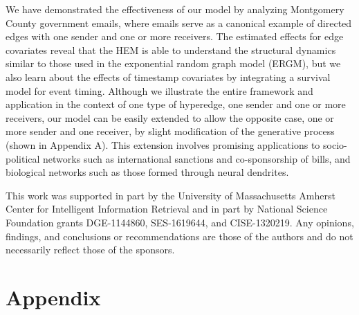 \documentclass[ba]{imsart}
\numberwithin{equation}{section}
\theoremstyle{plain}
\begin{document}
	We have demonstrated the effectiveness of our model by analyzing Montgomery County government emails, where emails serve as a canonical example of directed edges with one sender and one or more receivers. The estimated effects for edge covariates reveal that the HEM is able to understand the structural dynamics similar to those used in the exponential random graph model (ERGM), but we also learn about the effects of timestamp covariates by integrating a survival model for event timing. Although we illustrate the entire framework and application in the context of one type of hyperedge, one sender and one or more receivers, our model can be easily extended to allow the opposite case, one or more sender and one receiver, by slight modification of the generative process (shown in Appendix A). This extension involves promising applications to socio-political networks such as international sanctions and co-sponsorship of bills, and biological networks such as those formed through neural dendrites. %
	
	\begin{acknowledgement}
		This work was supported in part by the University of Massachusetts Amherst Center for Intelligent Information Retrieval and in part by National Science Foundation grants DGE-1144860, SES-1619644, and CISE-1320219. Any opinions, findings, and conclusions or recommendations are those of the authors and do not necessarily reflect those of the
		sponsors.
	\end{acknowledgement}
	
	\section*{Appendix}
\end{document}
